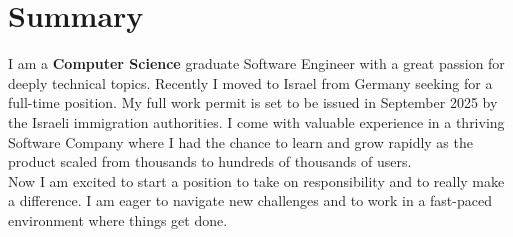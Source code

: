 \documentclass{style/modernsimplecv}
\begin{document}
\subsection*{}
\vspace{-3em}
\begin{minipage}{0.99\textwidth}
\section*{Summary}
    I am a \textbf{Computer Science} graduate Software Engineer with a great passion for deeply technical topics. Recently I moved to Israel from Germany seeking for a full-time position. My full work permit is set to be issued in September 2025 by the Israeli immigration authorities. I come with valuable experience in a thriving Software Company where I had the chance to learn and grow rapidly as the product scaled from thousands to hundreds of thousands of users.\\
    Now I am excited to start a position to take on responsibility and to really make a difference. I am eager to navigate new challenges and to work in a fast-paced environment where things get done.
\end{minipage}
\bigskip
\end{document}
